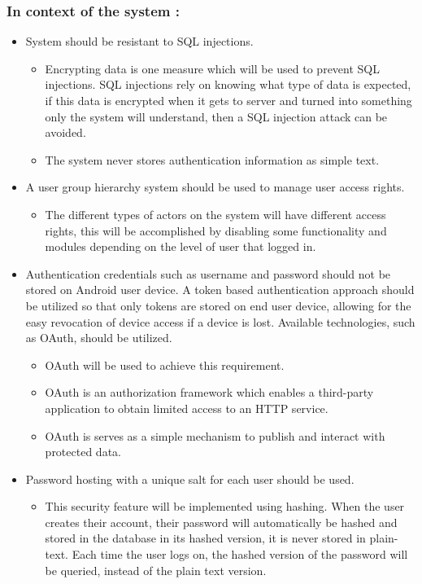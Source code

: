 \documentclass[a4paper,10pt]{article}
\begin{document}
	\subsubsection{In context of the system :} 
		\begin{itemize}
			\item System should be resistant to SQL injections.
				\begin{itemize}
					\item Encrypting data is one measure which will be used to prevent SQL injections. SQL injections rely on knowing what type of data is expected, if this data is encrypted when it gets to server and turned into something only the system will understand, then a SQL injection attack can be avoided. 
					\item The system never stores authentication information as simple text. 
				\end{itemize}
			\item A user group hierarchy system should be used to manage user access rights.
				\begin{itemize}
					\item The different types of actors on the system will have different access rights, this will be accomplished by disabling some functionality and modules depending on the level of user that logged in. 
				\end{itemize}
			\item Authentication credentials such as username and password should not be stored on Android user device. A token based authentication approach should be utilized so that only tokens are stored on end user device, allowing for the easy revocation of device access if a device is lost. Available technologies, such as OAuth, should be utilized.
				\begin{itemize}
					\item OAuth will be used to achieve this requirement. 
					\item OAuth is an authorization framework which enables a third-party application to obtain limited access to an HTTP service. 
					\item OAuth is serves as a simple mechanism to publish and interact with protected data. 
				\end{itemize}
			\item Password hosting with a unique salt for each user should be used.
				\begin{itemize}
					\item This security feature will be implemented using hashing. When the user creates their account, their password will automatically be hashed and stored in the database in its hashed version, it is never stored in plain-text. Each time the user logs on, the hashed version of the password will be queried, instead of the plain text version. 

\end{itemize}
\end{itemize}
\end{document}
